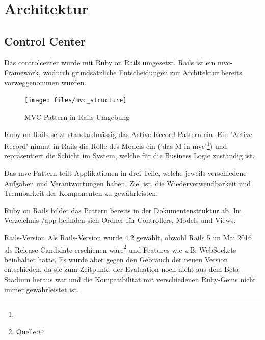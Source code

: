\section{Architektur} \label{sec:architecture}

\subsection*{Control Center}

Das \gls{controlcenter} wurde mit Ruby on Rails umgesetzt. Rails ist ein \gls{mvc}-Framework, wodurch grundsätzliche Entscheidungen zur Architektur bereits vorweggenommen wurden.

\begin{figure}[H]
	\centering
	\texttt{[image: files/mvc\_structure]}
	\caption{MVC-Pattern in Rails-Umgebung}
	\label{fig:tec:mvc}
\end{figure}

Ruby on Rails setzt standardmässig das Active-Record-Pattern ein. Ein 'Active Record' nimmt in Rails die Rolle des Models ein ('das M in \gls{mvc}'\footnote{}) und repräsentiert die Schicht im System, welche für die Business Logic zuständig ist.

Das \gls{mvc}-Pattern teilt Applikationen in drei Teile, welche jeweils verschiedene Aufgaben und Verantwortungen haben. Ziel ist, die Wiederverwendbarkeit und Trennbarkeit der Komponenten zu gewährleisten.

Ruby on Rails bildet das Pattern bereits in der Dokumentenstruktur ab. Im Verzeichnis /app befinden sich Ordner für Controllers, Models und Views.

\begin{decision}{Rails-Version}
Als Rails-Version wurde 4.2 gewählt, obwohl Rails 5 im Mai 2016 als Release Candidate erschienen wäre\footnote{Quelle: } und Features wie z.B. WebSockets beinhaltet hätte. Es wurde aber gegen den Gebrauch der neuen Version entschieden, da sie zum Zeitpunkt der Evaluation noch nicht aus dem Beta-Stadium heraus war und die Kompatibilität mit verschiedenen Ruby-Gems nicht immer gewährleistet ist.
\end{decision}

